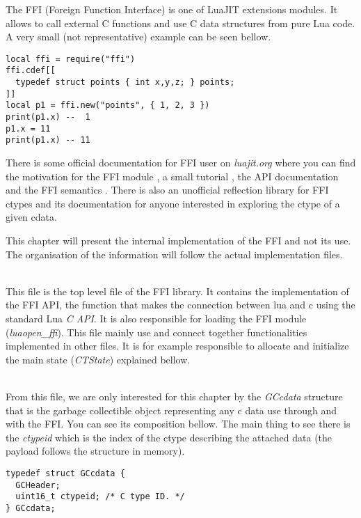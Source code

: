 
The FFI (Foreign Function Interface) is one of LuaJIT extensions modules. It
allows to call external C functions and use C data structures from pure Lua code.
A very small (not representative) example can be seen bellow.

\begin{lstlisting}[style=LuaStyle]
local ffi = require("ffi")
ffi.cdef[[
  typedef struct points { int x,y,z; } points;
]]
local p1 = ffi.new("points", { 1, 2, 3 })
print(p1.x) --  1
p1.x = 11
print(p1.x) -- 11
\end{lstlisting}
There is some official documentation for FFI user on \emph{luajit.org}
where you can find the motivation for the FFI module \cite{ffi-motivation},
a small tutorial \cite{ffi-tuto}, the API documentation \cite{ffi-api} and the
FFI semantics \cite{ffi-semantics}. There is also an unofficial reflection
library for FFI ctypes \cite{ffi-reflect} and its documentation
\cite{ffi-reflect-doc} for anyone interested in exploring the ctype of a given cdata.

This chapter will present the internal implementation of the FFI and not its use.
The organisation of the information will follow the actual implementation files.

\\
This file is the top level file of the FFI library. It contains the
implementation of the FFI API, the function that makes the connection between
lua and c using the standard Lua \emph{C API}.
It is also responsible for loading the FFI module (\emph{luaopen\_ffi}).
This file mainly use and connect together functionalities implemented in other
files. It is for example responsible to allocate and initialize the main state
(\emph{CTState}) explained bellow.

\\
From this file, we are only interested for this chapter by the \emph{GCcdata}
structure that is the garbage collectible object representing any c data use
through and with the FFI. You can see its composition bellow. The main thing to
see there is the \emph{ctypeid} which is the index of the ctype describing the
attached data (the payload follows the structure in memory).
\begin{lstlisting}[style=CStyle]
typedef struct GCcdata {
  GCHeader;
  uint16_t ctypeid;	/* C type ID. */
} GCcdata;
\end{lstlisting}

